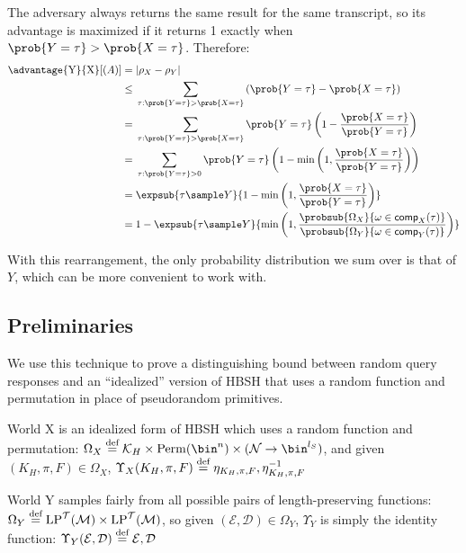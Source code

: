 \documentclass[eprint.tex]{subfiles}
\begin{document}
The adversary always returns the same result for the same transcript, so
its advantage is maximized if it returns 1 exactly when $\prob{Y = \tau} > \prob{X = \tau}$.
Therefore:
\begin{align*}
    \advantage{\textrm{Y}}{\textrm{X}}[(A)] ={}&
    |\rho_X - \rho_Y| \\
    \leq {}& \sum_{\tau: \prob{Y = \tau} > \prob{X = \tau}}
    \left(\prob{Y = \tau} - \prob{X = \tau}\right) \\
    = {}& \sum_{\tau: \prob{Y = \tau} > \prob{X = \tau}}
    \prob{Y = \tau}\left(1 - \frac{\prob{X = \tau}}{\prob{Y = \tau}}\right) \\
    = {}& \sum_{\tau: \prob{Y = \tau} > 0}
    \prob{Y = \tau}\left(1 - \minone{\frac{\prob{X = \tau}}{\prob{Y = \tau}}}\right) \\
    = {}& \expsub{\tau \sample Y}{1 - \minone{
           \frac{\prob{X = \tau}}{\prob{Y = \tau}}
        }} \\
    = {}& 1 - \expsub{\tau \sample Y}{\minone{
           \frac{\probsub{\Omega_X}{\omega \in \comp_X(\tau)}}
           {\probsub{\Omega_Y}{\omega \in \comp_Y(\tau)}}
        }}
\end{align*}

With this rearrangement, the only probability distribution we sum over is that
of $Y$, which can be more convenient to work with.

\subsection{Preliminaries}
We use this technique to prove a distinguishing bound
between random query responses and
an ``idealized'' version of HBSH that uses a random function and permutation
in place of pseudorandom primitives.

World X is
an idealized form of HBSH which uses a random function and permutation:
$\Omega_X \defeq \mathcal{K}_H \times \Perm(\bin^n) \times (\mathcal{N} \rightarrow \bin^{l_S})$,
and given $(K_H, \pi, F) \in \Omega_X$,
$\Upsilon_X(K_H, \pi, F) \stackrel{\text{def}}{=} \eta_{K_H, \pi, F}, \eta_{K_H, \pi, F}^{-1}$

World Y samples fairly from all possible pairs of length-preserving functions:
$\Omega_Y \stackrel{\text{def}}{=} \operatorname{LP}^\mathcal{T}(\mathcal{M}) \times \operatorname{LP}^\mathcal{T}(\mathcal{M})$,
so given $(\mathcal{E}, \mathcal{D}) \in \Omega_Y$, $\Upsilon_Y$ is simply the identity function:
$\Upsilon_Y(\mathcal{E}, \mathcal{D}) \stackrel{\text{def}}{=} \mathcal{E}, \mathcal{D}$
\end{document}
